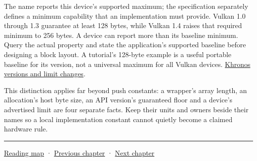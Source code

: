 The name  reports this device's supported maximum; the specification separately defines a minimum capability that an implementation must provide. Vulkan 1.0 through 1.3 guarantee at least 128 bytes, while Vulkan 1.4 raises that required minimum to 256 bytes. A device can report more than its baseline minimum. Query the actual property and state the application's supported baseline before designing a block layout. A tutorial's 128-byte example is a useful portable baseline for its version, not a universal maximum for all Vulkan devices. \href{https://docs.vulkan.org/guide/latest/versions.html}{Khronos versions and limit changes}.

This distinction applies far beyond push constants: a wrapper's array length, an allocation's host byte size, an API version's guaranteed floor and a device's advertised limit are four separate facts. Keep their units and owners beside their names so a local implementation constant cannot quietly become a claimed hardware rule.

\begin{center}\rule{0.5\linewidth}{0.5pt}\end{center}

\hyperref[volume-reading-map]{Reading map} · \hyperref[05-engine-i-ch023-execute-and-measure-a-metal-frame]{Previous chapter} · \hyperref[06-engine-ii-ch025-renderer-evolution-through-resource-ownership]{Next chapter}
